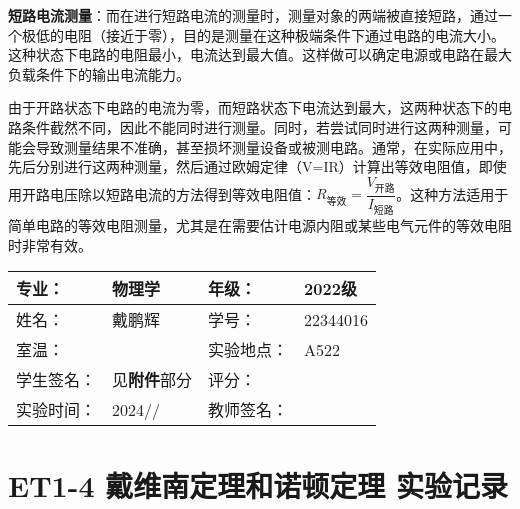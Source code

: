 \documentclass[dvipsnames, svgnames,a4paper,11pt]{article}
\begin{document}
	\textbf{短路电流测量}：而在进行短路电流的测量时，测量对象的两端被直接短路，通过一个极低的电阻（接近于零），目的是测量在这种极端条件下通过电路的电流大小。这种状态下电路的电阻最小，电流达到最大值。这样做可以确定电源或电路在最大负载条件下的输出电流能力。
	
	由于开路状态下电路的电流为零，而短路状态下电流达到最大，这两种状态下的电路条件截然不同，因此不能同时进行测量。同时，若尝试同时进行这两种测量，可能会导致测量结果不准确，甚至损坏测量设备或被测电路。通常，在实际应用中，先后分别进行这两种测量，然后通过欧姆定律（V=IR）计算出等效电阻值，即使用开路电压除以短路电流的方法得到等效电阻值：$ R_{\text{等效}} = \dfrac{V_{\text{开路}}}{I_{\text{短路}}} $。这种方法适用于简单电路的等效电阻测量，尤其是在需要估计电源内阻或某些电气元件的等效电阻时非常有效。
	



		
	
		
	
	
	
	
	\clearpage
	
	\begin{table}
		\renewcommand\arraystretch{1.7}
		\centering
		\begin{tabularx}{\textwidth}{|X|X|X|X|}
			\hline
			专业： & 物理学 & 年级： & 2022级 \\
			\hline
			姓名： & 戴鹏辉 & 学号： & 22344016\\
			\hline
			室温： &  & 实验地点： & A522 \\
			\hline
			学生签名：& 见\textbf{附件}部分 & 评分： &\\
			\hline
			实验时间：& 2024// & 教师签名：&\\
			\hline
		\end{tabularx}
	\end{table}
	
	\section{ET1-4 戴维南定理和诺顿定理  \quad\heiti 实验记录}
	
\end{document}
